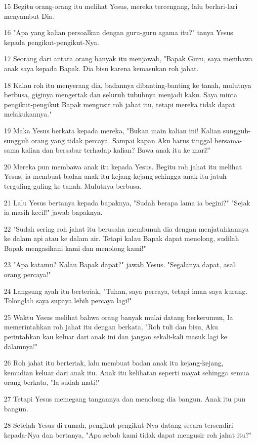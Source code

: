 \par 15 Begitu orang-orang itu melihat Yesus, mereka tercengang, lalu berlari-lari menyambut Dia.
\par 16 "Apa yang kalian persoalkan dengan guru-guru agama itu?" tanya Yesus kepada pengikut-pengikut-Nya.
\par 17 Seorang dari antara orang banyak itu menjawab, "Bapak Guru, saya membawa anak saya kepada Bapak. Dia bisu karena kemasukan roh jahat.
\par 18 Kalau roh itu menyerang dia, badannya dibanting-banting ke tanah, mulutnya berbusa, giginya mengertak dan seluruh tubuhnya menjadi kaku. Saya minta pengikut-pengikut Bapak mengusir roh jahat itu, tetapi mereka tidak dapat melakukannya."
\par 19 Maka Yesus berkata kepada mereka, "Bukan main kalian ini! Kalian sungguh-sungguh orang yang tidak percaya. Sampai kapan Aku harus tinggal bersama-sama kalian dan bersabar terhadap kalian? Bawa anak itu ke mari!"
\par 20 Mereka pun membawa anak itu kepada Yesus. Begitu roh jahat itu melihat Yesus, ia membuat badan anak itu kejang-kejang sehingga anak itu jatuh terguling-guling ke tanah. Mulutnya berbusa.
\par 21 Lalu Yesus bertanya kepada bapaknya, "Sudah berapa lama ia begini?" "Sejak ia masih kecil!" jawab bapaknya.
\par 22 "Sudah sering roh jahat itu berusaha membunuh dia dengan menjatuhkannya ke dalam api atau ke dalam air. Tetapi kalau Bapak dapat menolong, sudilah Bapak mengasihani kami dan menolong kami!"
\par 23 "Apa katamu? Kalau Bapak dapat?" jawab Yesus. "Segalanya dapat, asal orang percaya!"
\par 24 Langsung ayah itu berteriak, "Tuhan, saya percaya, tetapi iman saya kurang. Tolonglah saya supaya lebih percaya lagi!"
\par 25 Waktu Yesus melihat bahwa orang banyak mulai datang berkerumun, Ia memerintahkan roh jahat itu dengan berkata, "Roh tuli dan bisu, Aku perintahkan kau keluar dari anak ini dan jangan sekali-kali masuk lagi ke dalamnya!"
\par 26 Roh jahat itu berteriak, lalu membuat badan anak itu kejang-kejang, kemudian keluar dari anak itu. Anak itu kelihatan seperti mayat sehingga semua orang berkata, "Ia sudah mati!"
\par 27 Tetapi Yesus memegang tangannya dan menolong dia bangun. Anak itu pun bangun.
\par 28 Setelah Yesus di rumah, pengikut-pengikut-Nya datang secara tersendiri kepada-Nya dan bertanya, "Apa sebab kami tidak dapat mengusir roh jahat itu?"
